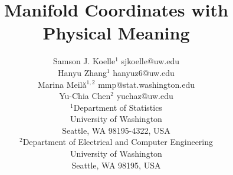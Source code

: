 \documentclass{article}
\begin{document}
\title{Manifold Coordinates with Physical Meaning}

%

\author{\name Samson J. Koelle${}^1$ \email sjkoelle@uw.edu \\
       \name Hanyu Zhang${}^1$ \email hanyuz6@uw.edu \\
       \name Marina Meil\u{a}${}^{1,2}$ \email mmp@stat.washington.edu \\
       \name Yu-Chia Chen${}^2$ \email yuchaz@uw.edu \\
       \addr ${}^1$Department of Statistics\\
       University of Washington\\
       Seattle, WA 98195-4322, USA   \\
       ${}^2$Department of Electrical and Computer Engineering \\
       University of Washington \\
       Seattle, WA 98195, USA
       }
       
\end{document}
